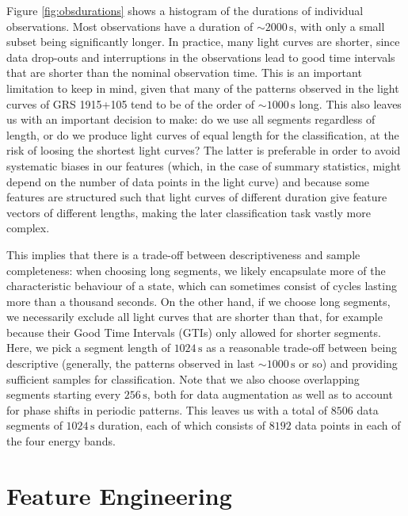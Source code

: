 \documentclass[fleqn,usenatbib]{mnras}
\begin{document}
Figure \ref{fig:obsdurations} shows a histogram of the durations of individual observations. Most observations have a duration of $\sim\!2000 \,\mathrm{s}$, with only a small subset being significantly longer.
In practice, many light curves are shorter, since data drop-outs and interruptions in the observations lead to good time intervals that are shorter than the nominal observation time. This is an important limitation to keep in mind, given that many of the patterns observed in the light curves of GRS 1915+105 tend to be of the order of $\sim\! 1000 \,\mathrm{s}$ long.  This also leaves us with an important decision to make: do we use all segments regardless of length, or do we produce light curves of equal length for the classification, at the risk of loosing the shortest light curves? The latter is preferable in order to avoid systematic biases in our features (which, in the case of summary statistics, might depend on the number of data points in the light curve) and because some features are structured such that light curves of different duration give feature vectors of different lengths, making the later classification task vastly more complex. 

This implies that there is a trade-off between descriptiveness and sample completeness: when choosing long segments, we likely encapsulate more of the characteristic behaviour of a state, which can sometimes consist of cycles lasting more than a thousand seconds. On the other hand, if we choose long segments, we necessarily exclude all light curves that are shorter than that, for example because their Good Time Intervals (GTIs) only allowed for shorter segments. Here, we pick a segment length of $1024\,\mathrm{s}$ as a reasonable trade-off between being descriptive (generally, the patterns observed in \citet{belloni2000} last $\sim\!1000\,\mathrm{s}$ or so) and providing sufficient samples for classification. Note that we also choose overlapping segments starting every $256\,\mathrm{s}$, both for data augmentation as well as to account for phase shifts in periodic patterns. This leaves us with a total of $8506$ data segments of $1024\,\mathrm{s}$ duration, each of which consists of $8192$ data points in each of the four energy bands.

\section{Feature Engineering}
\label{sec:featureengineering}
\end{document}
